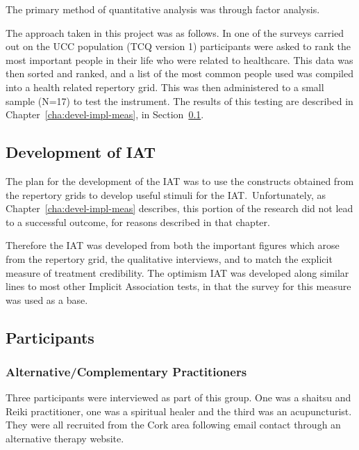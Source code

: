 The primary method of quantitative analysis was through factor analysis.

The approach taken in this project was as follows. In one of the surveys carried out on the UCC population (TCQ version 1) participants were asked to rank the most important people in their life who were related to healthcare. 
This data was then sorted and ranked, and a list of the most common people used was compiled into a health related repertory grid. 
This was then administered to a small sample (N=17) to test the instrument. 
 The results of this testing are described in Chapter~\ref{cha:devel-impl-meas}, in Section~\ref{sec:development-iat}.

\subsection{Development of IAT}
\label{sec:development-iat}

The plan for the development of the IAT was to use the constructs obtained from the repertory grids to develop useful stimuli for the IAT.\
Unfortunately, as Chapter~\ref{cha:devel-impl-meas} describes, this portion of the research did not lead to a successful outcome, for reasons described in that chapter.

Therefore the IAT was developed from both the important figures which arose from the repertory grid, the qualitative interviews, and to match the explicit measure of treatment credibility. The optimism IAT was developed along similar lines to most other Implicit Association tests, in that the survey for this measure was used as a base.

\subsection{Participants}
\label{sec:participants}



\subsubsection{Alternative/Complementary Practitioners}



Three participants were interviewed as part of this group. One was a shaitsu and Reiki practitioner, one was a spiritual healer and the third was an acupuncturist. They were all recruited from the Cork area following email contact through an alternative therapy website. 

